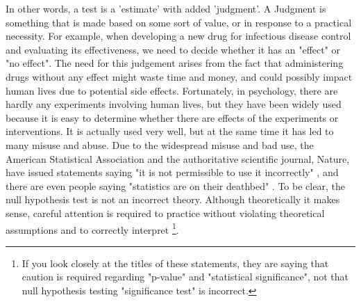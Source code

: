 \documentclass{ltjsbook}
\begin{document}
In other words, a test is a 'estimate' with added 'judgment'. A Judgment is something that is made based on some sort of value, or in response to a practical necessity.
For example, when developing a new drug for infectious disease control and evaluating its effectiveness, we need to decide whether it has an "effect" or "no effect". The need for this judgement arises from the fact that administering drugs without any effect might waste time and money, and could possibly impact human lives due to potential side effects.
Fortunately, in psychology, there are hardly any experiments involving human lives, but they have been widely used because it is easy to determine whether there are effects of the experiments or interventions. It is actually used very well, but at the same time it has led to many misuse and abuse. Due to the widespread misuse and bad use, the American Statistical Association and the authoritative scientific journal, Nature, have issued statements saying "it is not permissible to use it incorrectly" \parencite {wasserstein2016asa, amrhein2019scientists}, and there are even people saying "statistics are on their deathbed" \parencite {Toyoda202003}. To be clear, the null hypothesis test is not an incorrect theory. Although theoretically it makes sense, careful attention is required to practice without violating theoretical assumptions and to correctly interpret \footnote {If you look closely at the titles of these statements, they are saying that caution is required regarding "p-value" and "statistical significance", not that null hypothesis testing "significance test" is incorrect.}.
\end{document}

